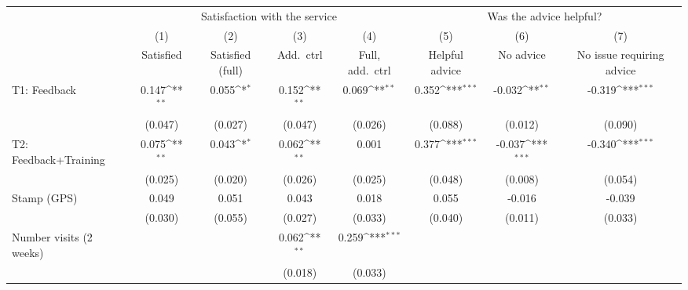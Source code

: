 {
\def\sym#1{\ifmmode^{#1}\else\(^{#1}\)\fi}
\begin{tabular}{l*{7}{c}}
\toprule
                    &\multicolumn{4}{c}{Satisfaction with the service}                                      &\multicolumn{3}{c}{Was the advice helpful?}                        \\\cmidrule(lr){2-5}\cmidrule(lr){6-8}
                    &\multicolumn{1}{c}{(1)}&\multicolumn{1}{c}{(2)}&\multicolumn{1}{c}{(3)}&\multicolumn{1}{c}{(4)}&\multicolumn{1}{c}{(5)}&\multicolumn{1}{c}{(6)}&\multicolumn{1}{c}{(7)}\\
                    &\multicolumn{1}{c}{Satisfied}&\multicolumn{1}{c}{Satisfied (full)}&\multicolumn{1}{c}{Add.\ ctrl}&\multicolumn{1}{c}{Full, add.\ ctrl}&\multicolumn{1}{c}{Helpful advice}&\multicolumn{1}{c}{No advice}&\multicolumn{1}{c}{No issue requiring advice}\\
\midrule
T1: Feedback        &       0.147\sym{**} &       0.055\sym{*}  &       0.152\sym{**} &       0.069\sym{**} &       0.352\sym{***}&      -0.032\sym{**} &      -0.319\sym{***}\\
                    &     (0.047)         &     (0.027)         &     (0.047)         &     (0.026)         &     (0.088)         &     (0.012)         &     (0.090)         \\
T2: Feedback+Training&       0.075\sym{**} &       0.043\sym{*}  &       0.062\sym{**} &       0.001         &       0.377\sym{***}&      -0.037\sym{***}&      -0.340\sym{***}\\
                    &     (0.025)         &     (0.020)         &     (0.026)         &     (0.025)         &     (0.048)         &     (0.008)         &     (0.054)         \\
Stamp (GPS)         &       0.049         &       0.051         &       0.043         &       0.018         &       0.055         &      -0.016         &      -0.039         \\
                    &     (0.030)         &     (0.055)         &     (0.027)         &     (0.033)         &     (0.040)         &     (0.011)         &     (0.033)         \\
Number visits (2 weeks)&                     &                     &       0.062\sym{**} &       0.259\sym{***}&                     &                     &                     \\
                    &                     &                     &     (0.018)         &     (0.033)         &                     &                     &                     \\

\end{tabular}}
